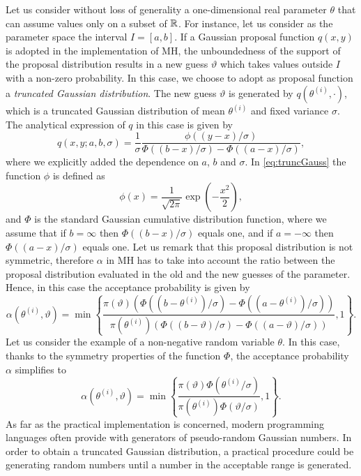 Let us consider without loss of generality a one-dimensional real parameter $\theta$ that can assume values only on a subset of $\mathbb{R}$. For instance, let us consider as the parameter space the interval $I = [a, b]$. If a Gaussian proposal function $q(x, y)$ is adopted in the implementation of MH, the unboundedness of the support of the proposal distribution results in a new guess $\vartheta$ which takes values outside $I$ with a non-zero probability. In this case, we choose to adopt as proposal function a \textit{truncated Gaussian distribution}. The new guess $\vartheta$ is generated by $q(\theta^{(i)}, \cdot)$, which is a truncated Gaussian distribution of mean $\theta^{(i)}$ and fixed variance $\sigma$. The analytical expression of $q$ in this case is given by
\begin{equation}\label{eq:truncGauss}
	q(x, y; a, b, \sigma) = \frac{1}{\sigma} \frac{\phi\left((y - x)/\sigma\right)}
	{\Phi\left((b - x)/\sigma\right) - \Phi\left((a - x)/\sigma\right)},
\end{equation}
where we explicitly added the dependence on $a$, $b$ and $\sigma$. In \eqref{eq:truncGauss} the function $\phi$ is defined as
\begin{equation}
	\phi(x) = \frac{1}{\sqrt{2\pi}} \exp(-\frac{x^2}{2}),
\end{equation}
and $\Phi$ is the standard Gaussian cumulative distribution function, where we assume that if $b = \infty$ then $\Phi((b-x)/\sigma)$ equals one, and if $a = -\infty$ then $\Phi((a-x)/\sigma)$ equals one. Let us remark that this proposal distribution is not symmetric, therefore $\alpha$ in MH has to take into account the ratio between the proposal distribution evaluated in the old and the new guesses of the parameter. Hence, in this case the acceptance probability is given by
\begin{equation}
		\alpha(\theta^{(i)}, \vartheta) = \min\left\{
		\frac{\pi(\vartheta)\left(\Phi\left((b - \theta^{(i)})/\sigma\right) - \Phi\left((a - \theta^{(i)})/\sigma\right)\right)}
		{\pi(\theta^{(i)})\left(\Phi\left((b - \vartheta)/\sigma\right) - \Phi\left((a - \vartheta)/\sigma\right)\right)}
		, 1\right\}.
\end{equation}
Let us consider the example of a non-negative random variable $\theta$. In this case, thanks to the symmetry properties of the function $\Phi$, the acceptance probability $\alpha$ simplifies to
\begin{equation}
	\alpha(\theta^{(i)}, \vartheta) = \min\left\{
	\frac{\pi(\vartheta)\Phi\left(\theta^{(i)}/\sigma\right)}
	{\pi(\theta^{(i)})\Phi\left(\vartheta/\sigma\right)}
	, 1\right\}.
\end{equation}
As far as the practical implementation is concerned, modern programming languages often provide with generators of pseudo-random Gaussian numbers. In order to obtain a truncated Gaussian distribution, a practical procedure could be generating random numbers until a number in the acceptable range is generated.

